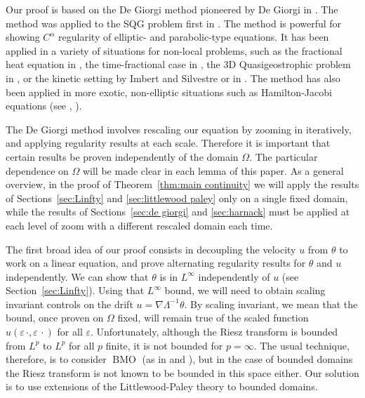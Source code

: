 \documentclass[11pt]{amsart}
\theoremstyle{remark}
\theoremstyle{definition}
\newcommand{\eps}{\varepsilon}
\DeclareMathOperator{\BMO}{BMO}
\newcommand{\grad}{\nabla}
\begin{document}
Our proof is based on  the De Giorgi method pioneered by De Giorgi in \cite{DG}.  The method was applied to the SQG problem first in \cite{CaVa.sqg}.  The method is powerful for showing $C^\alpha$ regularity of elliptic- and parabolic-type equations. It has been applied in a variety of situations for non-local problems, such as the fractional heat equation in \cite{CaChVa.nio}, the time-fractional case in \cite{AlCaVa}, the 3D Quasigeostrophic problem in \cite{NoVa.qg}, or the kinetic setting by Imbert and Silvestre \cite{ImSi} or in \cite{St}.  The method has also been applied in more exotic, non-elliptic situations such as Hamilton-Jacobi equations (see \cite{ChVa}, \cite{StVa.hamjac}).  

The De Giorgi method involves rescaling our equation by zooming in iteratively, and applying regularity results at each scale.  Therefore it is important that certain results be proven independently of the domain $\Omega$.  
The particular dependence on $\Omega$ will be made clear in each lemma of this paper.  
As a general overview, in the proof of Theorem~\ref{thm:main continuity} we will apply the results of Sections~\ref{sec:Linfty} and \ref{sec:littlewood paley} only on a single fixed domain, while the results of Sections~\ref{sec:de giorgi} and \ref{sec:harnack} must be applied at each level of zoom with a different rescaled domain each time.  

\vskip0.3cm

The first broad  idea of our proof consists in decoupling the  velocity $u$ from  $\theta$ to work on  a linear equation, and prove alternating regularity results for $\theta$ and $u$ independently.  We can show that $\theta$ is in $L^\infty$ independently of $u$ (see Section~\ref{sec:Linfty}).  
Using that $L^\infty$ bound, we will need to obtain scaling invariant controls on the drift   $u = \grad \Lambda^{-1} \theta$.  By scaling invariant, we mean that the bound, once proven on $\Omega$ fixed, will remain true of the scaled function $u(\eps \, \cdot, \eps \, \cdot)$ for all $\eps$.  
Unfortunately, although the Riesz transform is bounded from $L^p$ to $L^p$ for all $p$ finite, it is not bounded for $p = \infty$.  
The usual technique, therefore, is to consider $\BMO$ (as in \cite{CaVa.sqg} and \cite{NoVa.qg}), but in the case of bounded domains the Riesz transform is not known to be bounded in this space either.  Our solution is to use extensions of the Littlewood-Paley theory to bounded domains. 
\end{document}
